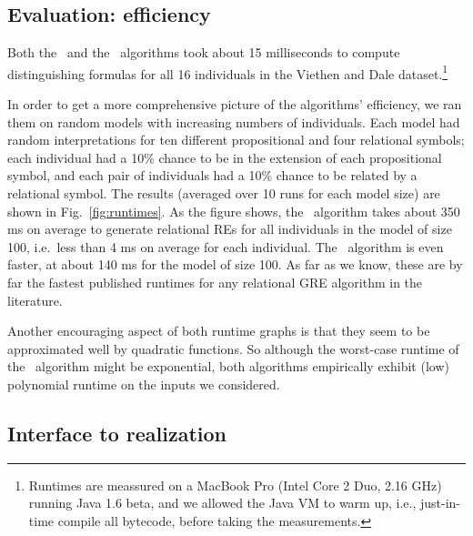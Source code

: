 \subsection{Evaluation: efficiency}

Both the \el\ and the \alc\ algorithms took about 15 milliseconds to
compute distinguishing formulas for all 16 individuals in the Viethen
and Dale dataset.\footnote{Runtimes are meassured on a MacBook Pro
  (Intel Core 2 Duo, 2.16 GHz) running Java 1.6 beta, and we allowed the
  Java VM to warm up, i.e., just-in-time compile all bytecode, before
  taking the measurements.}

In order to get a more comprehensive picture of the algorithms'
efficiency, we ran them on random models with increasing numbers of
individuals.  Each model had random interpretations for ten different
propositional and four relational symbols; each individual had a 10\%
chance to be in the extension of each propositional symbol, and each
pair of individuals had a 10\% chance to be related by a relational
symbol.  The results (averaged over 10 runs for each model size) are
shown in Fig.~\ref{fig:runtimes}.  As the figure shows, the \el\
algorithm takes about 350 ms on average to generate relational REs for
all individuals in the model of size 100, i.e.\ less than 4 ms on
average for each individual.  The \alc\ algorithm is even faster, at
about 140 ms for the model of size 100.  As far as we know, these are
by far the fastest published runtimes for any relational GRE algorithm
in the literature.

Another encouraging aspect of both runtime graphs is that they seem to
be approximated well by quadratic functions.  So although the
worst-case runtime of the \el\ algorithm might be exponential, both
algorithms empirically exhibit (low) polynomial runtime on the inputs
we considered.



\subsection{Interface to realization}
\label{sec:discussion-realization}


